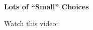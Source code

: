 \def\theTopic{Galton's Board }

\begin{center}
{\bf {\large Lots of ``Small'' Choices}}\\
\end{center}

Watch this video:

\newpage


